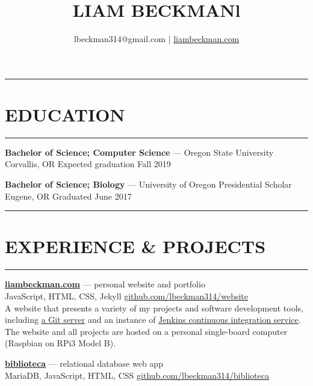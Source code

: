 \documentclass[a4paper]{article}
\title{\textcolor{my-red}{LIAM BECKMANl}}
\author{lbeckman314@gmail.com |  \href{https://liambeckman.com}{liambeckman.com}}
\date{\vspace{-5ex}}
\begin{document}
\maketitle

\rule{\textwidth}{1pt}\vspace{-1.5em}
\section*{\large{EDUCATION}}\vspace{-1.5em}
\textcolor{my-grey}{\rule{\linewidth}{1pt}}

\medbreak

\textbf{Bachelor of Science; Computer Science} --- Oregon State University\\
\textcolor{my-grey}{Corvallis, OR \hfill Expected graduation Fall 2019}

\textcolor{my-grey}{\dotfill}
\medbreak

\textbf{Bachelor of Science; Biology} --- University of Oregon Presidential Scholar\\
\textcolor{my-grey}{Eugene, OR \hfill Graduated June 2017}

\medbreak

\noindent\rule{\textwidth}{1pt}\vspace{-1.5em}
\section*{\large{EXPERIENCE \& PROJECTS}}\vspace{-1.5em}
\textcolor{my-grey}{\rule{\linewidth}{1pt}}


\textcolor{my-blue}{\textbf{\href{https://liambeckman.com}{liambeckman.com}}} --- personal website and portfolio\\
\textcolor{my-grey}{JavaScript, HTML, CSS, Jekyll \hfill \href{https://github.com/lbeckman314/website}{github.com/lbeckman314/website}}\\

A website that presents a variety of my projects and software development tools, including \href{https://git.liambeckman.com}{a Git server} and an instance of \href{https://liambeckman.com/jenkins}{Jenkins continuous integration service}. The website and all projects are hosted on a personal single-board computer (Raspbian on RPi3 Model B).

\textcolor{my-grey}{\dotfill}
\medbreak

\textcolor{my-blue}{\textbf{\href{https://biblioteca.liambeckman.com}{biblioteca}}} --- relational database web app\\
\textcolor{my-grey}{MariaDB, JavaScript, HTML, CSS \hfill \href{https://github.com/lbeckman314/biblioteca}{github.com/lbeckman314/biblioteca}}\\
\end{document}
